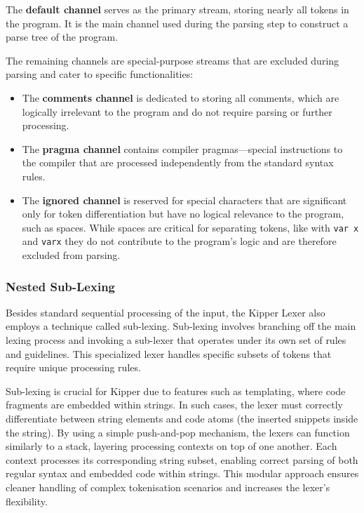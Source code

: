 The \textbf{default channel} serves as the primary stream, storing nearly all tokens in the program. It is the main channel used during the parsing step to construct a parse tree of the program.

The remaining channels are special-purpose streams that are excluded during parsing and cater to specific functionalities:

\begin{itemize}
	\item The \textbf{comments channel} is dedicated to storing all comments, which are logically irrelevant to the program and do not require parsing or further processing.
	\item The \textbf{pragma channel} contains compiler pragmas—special instructions to the compiler that are processed independently from the standard syntax rules.
	\item The \textbf{ignored channel} is reserved for special characters that are significant only for token differentiation but have no logical relevance to the program, such as spaces. While spaces are critical for separating tokens, like with \lstinline|var x| and \lstinline|varx| they do not contribute to the program's logic and are therefore excluded from parsing.
\end{itemize}
	
\subsubsection{Nested Sub-Lexing}
\label{sec:nested-sub-lexing}

Besides standard sequential processing of the input, the Kipper Lexer also employs a technique called sub-lexing. Sub-lexing involves branching off the main lexing process and invoking a sub-lexer that operates under its own set of rules and guidelines. This specialized lexer handles specific subsets of tokens that require unique processing rules.

Sub-lexing is crucial for Kipper due to features such as templating, where code fragments are embedded within strings. In such cases, the lexer must correctly differentiate between string elements and code atoms (the inserted snippets inside the string). By using a simple push-and-pop mechanism, the lexers can function similarly to a stack, layering processing contexts on top of one another. Each context processes its corresponding string subset, enabling correct parsing of both regular syntax and embedded code within strings. This modular approach ensures cleaner handling of complex tokenisation scenarios and increases the lexer's flexibility.

